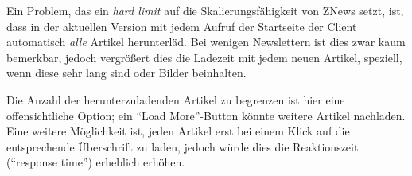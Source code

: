 Ein Problem, das ein \emph{hard limit} auf die Skalierungsfähigkeit von ZNews setzt,
ist, dass in der aktuellen Version mit jedem Aufruf der Startseite der Client automatisch
\emph{alle} Artikel herunterläd.
Bei wenigen Newslettern ist dies zwar kaum bemerkbar,
jedoch vergrößert dies die Ladezeit mit jedem neuen Artikel,
speziell, wenn diese sehr lang sind oder Bilder beinhalten.

Die Anzahl der herunterzuladenden Artikel zu begrenzen ist hier eine offensichtliche Option;
ein ``Load More''-Button könnte weitere Artikel nachladen.
Eine weitere Möglichkeit ist,
jeden Artikel erst bei einem Klick auf die entsprechende Überschrift zu laden,
jedoch würde dies die Reaktionszeit (``response time'') erheblich erhöhen.
